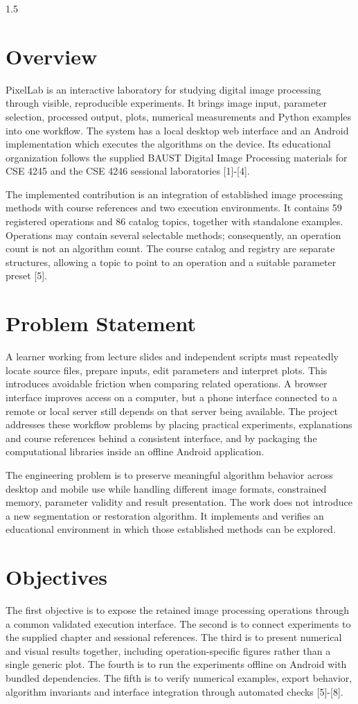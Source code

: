 \begin{spacing}{1.5}
\section{Overview}
PixelLab is an interactive laboratory for studying digital image processing through visible, reproducible experiments. It brings image input, parameter selection, processed output, plots, numerical measurements and Python examples into one workflow. The system has a local desktop web interface and an Android implementation which executes the algorithms on the device. Its educational organization follows the supplied BAUST Digital Image Processing materials for CSE 4245 and the CSE 4246 sessional laboratories [1]-[4].

The implemented contribution is an integration of established image processing methods with course references and two execution environments. It contains 59 registered operations and 86 catalog topics, together with standalone examples. Operations may contain several selectable methods; consequently, an operation count is not an algorithm count. The course catalog and registry are separate structures, allowing a topic to point to an operation and a suitable parameter preset [5].

\section{Problem Statement}
A learner working from lecture slides and independent scripts must repeatedly locate source files, prepare inputs, edit parameters and interpret plots. This introduces avoidable friction when comparing related operations. A browser interface improves access on a computer, but a phone interface connected to a remote or local server still depends on that server being available. The project addresses these workflow problems by placing practical experiments, explanations and course references behind a consistent interface, and by packaging the computational libraries inside an offline Android application.

The engineering problem is to preserve meaningful algorithm behavior across desktop and mobile use while handling different image formats, constrained memory, parameter validity and result presentation. The work does not introduce a new segmentation or restoration algorithm. It implements and verifies an educational environment in which those established methods can be explored.

\section{Objectives}
The first objective is to expose the retained image processing operations through a common validated execution interface. The second is to connect experiments to the supplied chapter and sessional references. The third is to present numerical and visual results together, including operation-specific figures rather than a single generic plot. The fourth is to run the experiments offline on Android with bundled dependencies. The fifth is to verify numerical examples, export behavior, algorithm invariants and interface integration through automated checks [5]-[8].


\end{spacing}
